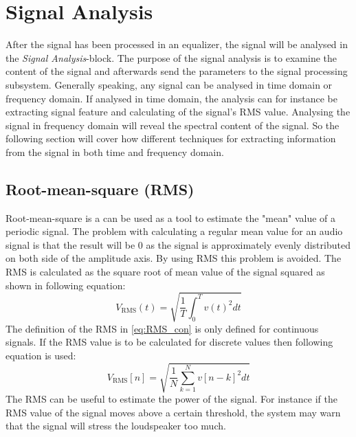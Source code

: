 \section{Signal Analysis}

After the signal has been processed in an equalizer, the signal will be analysed in the \textit{Signal Analysis}-block. The purpose of the signal analysis is to examine the content of the signal and afterwards send the parameters to the signal processing subsystem. Generally speaking, any signal can be analysed in time domain or frequency domain. If analysed in time domain, the analysis can for instance be extracting signal feature and calculating of the signal's RMS value. Analysing the signal in frequency domain will reveal the spectral content of the signal. So the following section will cover how different techniques for extracting information from the signal in both time and frequency domain.



\subsection*{Root-mean-square (RMS)}
Root-mean-square is a can be used as a tool to estimate the "mean" value of a periodic signal. The problem with calculating a regular mean value for an audio signal is that the result will be 0 as the signal is approximately evenly distributed on both side of the amplitude axis. By using RMS this problem is avoided. The RMS is calculated as the square root of mean value of the signal squared as shown in following equation:
\begin{equation}\label{eq:RMS_con}
V_{\text{RMS}}(t) = \sqrt{\frac{1}{T}\int_0^T v(t)^2 dt}
\end{equation}
The definition of the RMS in \autoref{eq:RMS_con} is only defined for continuous signals. If the RMS value is to be calculated for discrete values then following equation is used:
\begin{equation}
V_{\text{RMS}}[n] = \sqrt{\frac{1}{N}\sum_{k=1}^{N} v[n-k]^2 dt}
\end{equation}
The RMS can be useful to estimate the power of the signal. For instance if the RMS value of the signal moves above a certain threshold, the system may warn that the signal will stress the loudspeaker too much.

